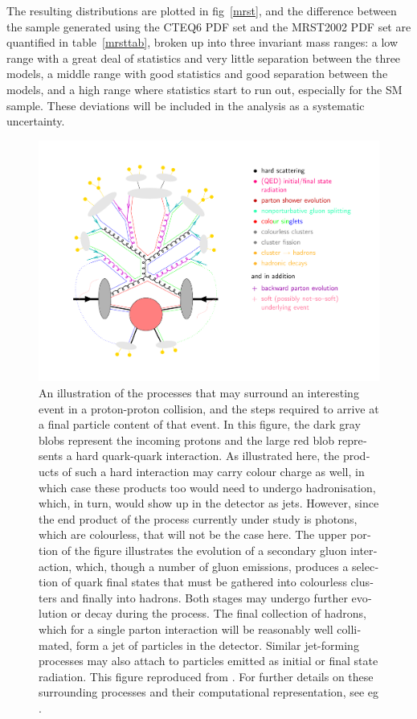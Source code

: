 \begin{english}
The resulting distributions are plotted in fig~\ref{mrst}, and the difference between the sample generated using the CTEQ6 PDF set and the MRST2002 PDF set are quantified in table~\ref{mrsttab}, broken up into three invariant mass ranges: a low range with a great deal of statistics and very little separation between the three models, a middle range with good statistics and good separation between the models, and a high range where statistics start to run out, especially for the SM sample. These deviations will be included in the analysis as a systematic uncertainty.

\begin{figure}[htb]
\includegraphics[width=\textwidth]{figures/Zep-soft}
\caption{An illustration of the processes that may surround an interesting event in a proton-proton collision, and the steps required to arrive at a final particle content of that event. In this figure, the dark gray blobs represent the incoming protons and the large red blob represents a hard quark-quark interaction. As illustrated here, the products of such a hard interaction may carry colour charge as well, in which case these products too would need to undergo hadronisation, which, in turn, would show up in the detector as jets. However, since the end product of the process currently under study is photons, which are colourless, that will not be the case here. The upper portion of the figure illustrates the evolution of a secondary gluon interaction, which, though a number of gluon emissions, produces a selection of quark final states that must be gathered into colourless clusters and finally into hadrons. Both stages may undergo further evolution or decay during the process. The final collection of hadrons, which for a single parton interaction will be reasonably well collimated, form a jet of particles in the detector. Similar jet-forming processes may also attach to particles emitted as initial or final state radiation. This figure reproduced from \cite{zep}. For further details on these surrounding processes and their computational representation, see eg \cite{pythman}.
\label{zep}}
\end{figure}


\end{english}
